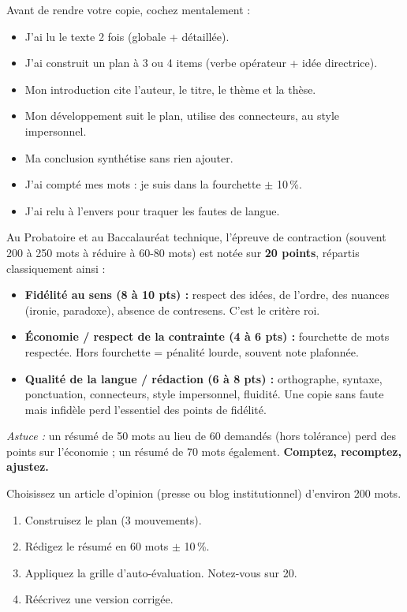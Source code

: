 \documentclass[11pt]{article}
\newcounter{popsec}
\newcounter{popsub}
\newcommand{\courssub}[1]{%
  \stepcounter{popsub}%
  \par\vspace{9pt}\noindent{\popxbold\fontsize{11.5}{13}\selectfont\color{popink}{\color{poporange}\thepopsec.\thepopsub}\hspace{6pt}#1}\par\nopagebreak\vspace{4pt}
}
\begin{document}
\begin{aretenir}
Avant de rendre votre copie, cochez mentalement :
\begin{itemize}
    \item J'ai lu le texte 2 fois (globale + détaillée).
    \item J'ai construit un plan à 3 ou 4 items (verbe opérateur + idée directrice).
    \item Mon introduction cite l'auteur, le titre, le thème et la thèse.
    \item Mon développement suit le plan, utilise des connecteurs, au style impersonnel.
    \item Ma conclusion synthétise sans rien ajouter.
    \item J'ai compté mes mots : je suis dans la fourchette $\pm$ 10\,\%.
    \item J'ai relu à l'envers pour traquer les fautes de langue.
\end{itemize}
\end{aretenir}

\begin{savaistu}
Au Probatoire et au Baccalauréat technique, l'épreuve de contraction (souvent 200 à 250 mots à réduire à 60-80 mots) est notée sur \textbf{20 points}, répartis classiquement ainsi :
\begin{itemize}
    \item \textbf{Fidélité au sens (8 à 10 pts) :} respect des idées, de l'ordre, des nuances (ironie, paradoxe), absence de contresens. C'est le critère roi.
    \item \textbf{Économie / respect de la contrainte (4 à 6 pts) :} fourchette de mots respectée. Hors fourchette = pénalité lourde, souvent note plafonnée.
    \item \textbf{Qualité de la langue / rédaction (6 à 8 pts) :} orthographe, syntaxe, ponctuation, connecteurs, style impersonnel, fluidité. Une copie sans faute mais infidèle perd l'essentiel des points de fidélité.
\end{itemize}
\emph{Astuce :} un résumé de 50 mots au lieu de 60 demandés (hors tolérance) perd des points sur l'économie ; un résumé de 70 mots également. \textbf{Comptez, recomptez, ajustez.}
\end{savaistu}

\courssub{Bilan et remédiation ciblée}

\begin{exercice}
Choisissez un article d'opinion (presse ou blog institutionnel) d'environ 200 mots.
\begin{enumerate}
    \item Construisez le plan (3 mouvements).
    \item Rédigez le résumé en 60 mots $\pm$ 10\,\%.
    \item Appliquez la grille d'auto-évaluation. Notez-vous sur 20.
    \item Réécrivez une version corrigée.
\end{enumerate}
\end{exercice}
\end{document}
